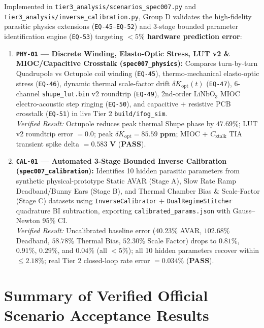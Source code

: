 \documentclass[11pt,a4paper]{article}
\begin{document}
Implemented in \texttt{tier3\_analysis/scenarios\_spec007.py} and \texttt{tier3\_analysis/inverse\_calibration.py}, Group D validates the high-fidelity parasitic physics extensions (\texttt{EQ-45}--\texttt{EQ-52}) and 3-stage bounded parameter identification engine (\texttt{EQ-53}) targeting \textbf{$<5\%$ hardware prediction error}:
\begin{enumerate}
    \item \textbf{\texttt{PHY-01} --- Discrete Winding, Elasto-Optic Stress, LUT v2 \& MIOC/Capacitive Crosstalk (\texttt{spec007\_physics}):}
    Compares turn-by-turn Quadrupole vs Octupole coil winding (\texttt{EQ-45}), thermo-mechanical elasto-optic stress (\texttt{EQ-46}), dynamic thermal scale-factor drift $\delta K_{\text{opt}}(t)$ (\texttt{EQ-47}), 6-channel \texttt{shupe\_lut.bin} v2 roundtrip (\texttt{EQ-49}), 2nd-order $\text{LiNbO}_3$ MIOC electro-acoustic step ringing (\texttt{EQ-50}), and capacitive + resistive PCB crosstalk (\texttt{EQ-51}) in live Tier 2 \texttt{build/ifog\_sim}.\\
    \emph{Verified Result:} Octupole reduces peak thermal Shupe phase by $\mathbf{47.69\%}$; LUT v2 roundtrip error $= \mathbf{0.0}$; peak $\delta K_{\text{opt}} = \mathbf{85.59\text{ ppm}}$; MIOC + $C_{\text{xtalk}}$ TIA transient spike delta $= \mathbf{0.583\text{ V}}$ (\textbf{PASS}).

    \item \textbf{\texttt{CAL-01} --- Automated 3-Stage Bounded Inverse Calibration (\texttt{spec007\_calibration}):}
    Identifies 10 hidden parasitic parameters from synthetic physical-prototype Static AVAR (Stage A), Slow Rate Ramp Deadband/Bunny Ears (Stage B), and Thermal Chamber Bias \& Scale-Factor (Stage C) datasets using \texttt{InverseCalibrator} + \texttt{DualRegimeStitcher} quadrature BI subtraction, exporting \texttt{calibrated\_params.json} with Gauss--Newton 95\% CI.\\
    \emph{Verified Result:} Uncalibrated baseline error ($40.23\%$ AVAR, $102.68\%$ Deadband, $58.78\%$ Thermal Bias, $52.30\%$ Scale Factor) drops to $\mathbf{0.81\%}$, $\mathbf{0.91\%}$, $\mathbf{0.29\%}$, and $\mathbf{0.04\%}$ (all $<5\%$); all 10 hidden parameters recover within $\mathbf{\le 2.18\%}$; real Tier 2 closed-loop rate error $= \mathbf{0.034\%}$ (\textbf{PASS}).
\end{enumerate}

\section{Summary of Verified Official Scenario Acceptance Results}
\end{document}
